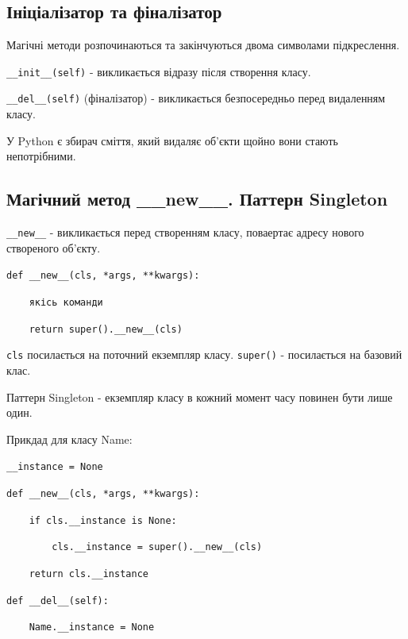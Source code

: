 \subsection{Ініціалізатор та фіналізатор} 
\begin{frame}
Магічні методи розпочинаються та закінчуються двома символами підкреслення.

\texttt{\_\_init\_\_(self)} - викликається відразу після створення класу.

\texttt{\_\_del\_\_(self)} (фіналізатор) - викликається безпосередньо перед видаленням класу. 

У Python є збирач сміття, який видаляє об'єкти щойно вони стають непотрібними.

\end{frame}

\subsection{Магічний метод \_\_new\_\_. Паттерн Singleton} 
\begin{frame}
\texttt{\_\_new\_\_} - викликається перед створенням класу, поваертає адресу нового створеного об'єкту. 

\texttt{def \_\_new\_\_(cls, *args, **kwargs):} 

\texttt{~~~~якісь команди} 

\texttt{~~~~return super().\_\_new\_\_(cls)} 

\texttt{cls} посилається на поточний екземпляр класу. \texttt{super()} - посилається на базовий клас.

\end{frame}

\begin{frame}
Паттерн Singleton - екземпляр класу в кожний момент часу повинен бути лише один.

Прикдад для класу Name:

\texttt{\_\_instance = None}
 
\texttt{def \_\_new\_\_(cls, *args, **kwargs):} 

\texttt{~~~~if cls.\_\_instance is None:} 

\texttt{~~~~~~~~cls.\_\_instance = super().\_\_new\_\_(cls)} 

\texttt{~~~~return cls.\_\_instance} 

\texttt{def \_\_del\_\_(self):} 

\texttt{~~~~Name.\_\_instance = None}
\end{frame}

